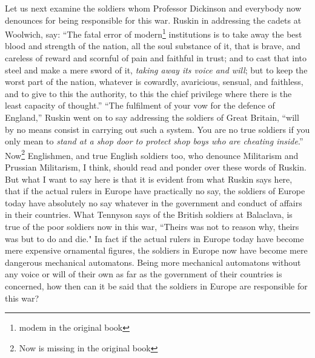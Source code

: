 Let us next examine the soldiers whom Professor Dickinson and everybody now denounces for being responsible for this war.
Ruskin  in addressing the cadets at Woolwich,  say: ``The fatal error of modern\footnote{modem in the original book} institutions is to take away the best blood and strength of the nation, all the soul substance of it, that is brave, and careless of reward and scornful of pain and faithful in trust; and to cast that into steel and make a mere sword of it, \emph{taking away its voice and will}; but to keep the worst part of the nation, whatever is cowardly, avaricious, sensual, and faithless, and to give to this the authority, to this the chief privilege where there is the least capacity of thought.''
``The fulfilment of your vow for the defence of England,'' Ruskin went on to say addressing the soldiers of Great Britain, ``will by no means consist in carrying out such a system. You are no true soldiers if you only mean to \emph{stand at a shop door to protect shop boys who are cheating inside}.''
Now\footnote{Now is missing in the original book} Englishmen, and true English soldiers too, who denounce Militarism and Prussian Militarism, I think, should read and ponder over these words of Ruskin.
But what I want to say here is that it is evident from what Ruskin says here, that if the actual rulers in Europe have practically no say, the soldiers of Europe today have absolutely no say whatever in the government and conduct of affairs in their countries.
What Tennyson  says of the British soldiers at Balaclava,  is true of the poor soldiers now in this war, ``Theirs was not to reason why, theirs was but to do and die." 
In fact if the actual rulers in Europe today have become mere expensive ornamental figures, the soldiers in Europe now have become mere dangerous mechanical automatons.
Being more mechanical automatons without any voice or will of their own as far as the government of their countries is concerned, how then can it be said that the soldiers in Europe are responsible for this war?

